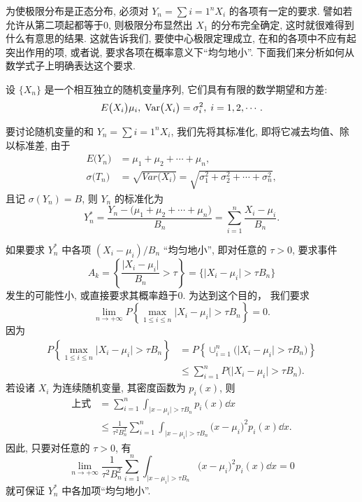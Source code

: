 为使极限分布是正态分布, 必须对 $ Y_n = \sum{i=1}^n X_i $ 的各项有一定的要求.
譬如若允许从第二项起都等于0, 则极限分布显然出 $ X_1 $ 的分布完全确定, 这时就很难得到什么有意思的结果.
这就告诉我们, 要使中心极限定理成立, 在和的各项中不应有起突出作用的项, 或者说, 要求各项在概率意义下``均匀地小''.
下面我们来分析如何从数学式子上明确表达这个要求.

设 $ \{ X_n \} $ 是一个相互独立的随机变量序列, 它们具有有限的数学期望和方差:
\begin{equation*}
    E \bigl( X_i \bigr) \mu_i, \;\operatorname{Var}  \bigl( X_i \bigr) = \sigma_i^2, \; i = 1, 2, \cdots.
\end{equation*}

要讨论随机变量的和 $ Y_n = \sum{i=1}^n X_i $, 我们先将其标准化, 即将它减去均值、除以标准差, 由于
\begin{align*}
    E \bigl( Y_n \bigr) & = \mu_1 + \mu_2 + \dotsb + \mu_n,\\
    \sigma \bigl( T_n \bigr) & = \sqrt{Var \bigl( X_i \bigr)} = \sqrt{\sigma_1^2 + \sigma_2^2 + \dotsb + \sigma_n^2},
\end{align*}
且记 $ \sigma ( Y_n ) = B $, 则 $ Y_n $ 的标准化为
\begin{equation*}
    Y_n^* = \frac{Y_n - \bigl( \mu_1 + \mu_2 + \dotsb + \mu_n \bigr)}{B_n} = \sum_{i=1}^n \frac{X_i - \mu_i}{B_n}.
\end{equation*}

如果要求 $ Y_n^* $ 中各项 $ (X_i - \mu_i) / B_n $ ``均匀地小'', 即对任意的 $ \tau > 0 $, 要求事件
\begin{equation*}
    A_k = \left\{ \frac{\lvert X_i - \mu_i \rvert}{B_n} > \tau \right\} = \bigl\{ \lvert X_i - \mu_i \rvert > \tau B_n \bigr\}
\end{equation*}
发生的可能性小, 或直接要求其概率趋于0.
为达到这个目的， 我们要求
\begin{equation*}
    \lim_{n \to +\infty} P \left\{ \max_{1 \leq i \leq n} \lvert X_i - \mu_i \rvert > \tau B_n \right\} = 0.
\end{equation*}
因为
\begin{align*}
    P \left\{ \max_{1 \leq i \leq n} \lvert X_i - \mu_i \rvert > \tau B_n \right\} & = P \left\{ \cup_{i=1}^n \bigl( \lvert X_i - \mu_i \rvert > \tau B_n \bigr) \right\}\\
    & \leq \sum_{i=1}^n P \bigl( \lvert X_i - \mu_i \rvert > \tau B_n \bigr).
\end{align*}
若设诸 $ X_i $ 为连续随机变量, 其密度函数为 $ p_i (x) $, 则
\begin{align*}
    \text{上式} & = \sum_{i=1}^n \int_{\lvert x - \mu_i \rvert > \tau B_n} p_i (x) \dd x\\
    & \leq \frac{1}{\tau^2 B_n^2} \sum_{i=1}^n \int_{\lvert x - \mu_i \rvert > \tau B_n} \bigl( x - \mu_i \bigr)^2 p_i (x) \dd x.
\end{align*}
因此, 只要对任意的 $ \tau > 0 $, 有
\begin{equation}\label{eq:4.4.4}
    \lim_{n \to +\infty} \frac{1}{\tau^2 B_n^2} \sum_{i=1}^n \int_{\lvert x - \mu_i \rvert > \tau B_n} \bigl( x - \mu_i \bigr)^2 p_i (x) \dd x = 0
\end{equation}
就可保证 $ Y_n^* $ 中各加项``均匀地小''.

